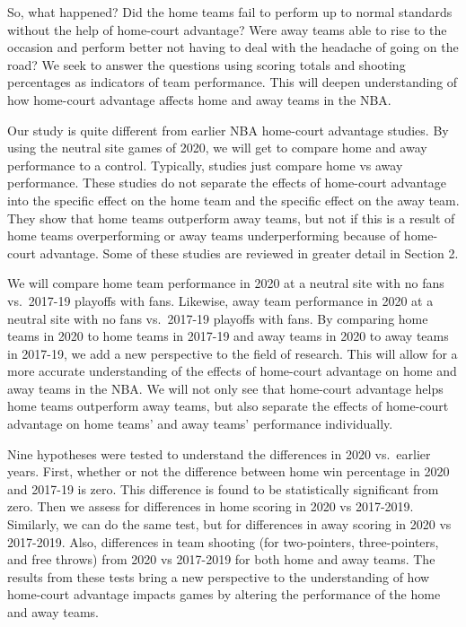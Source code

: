 \documentclass[10pt]{article}
\begin{document}
So, what happened? Did the home teams fail to perform up to normal standards
without the help of home-court advantage? Were away teams able to rise to
the occasion and perform better not having to deal with the headache of going
on the road? We seek to answer the questions using scoring totals and shooting
percentages as indicators of team performance. This will deepen understanding
of how home-court advantage affects home and away teams in the NBA.

Our study is quite different from earlier NBA home-court advantage studies.
By using the neutral site games of 2020, we will get to compare home and away
performance to a control. Typically, studies just compare home vs away
performance. These studies do not separate the effects of home-court advantage
into the specific effect on the home team and the specific effect on the away
team. They show that home teams outperform away teams, but not if this is a
result of home teams overperforming or away teams underperforming because of
home-court advantage. Some of these studies are reviewed in greater detail in Section 2.

We will compare home team performance in 2020 at a neutral site with
no fans vs.~2017-19 playoffs with fans. Likewise, away team performance in 2020
at a neutral site with no fans vs.~2017-19 playoffs with fans. By comparing home
teams in 2020 to home teams in 2017-19 and away teams in 2020 to away teams in
2017-19, we add a new perspective to the field of research. This will allow for
a more accurate understanding of the effects of home-court advantage on home and
away teams in the NBA. We will not only see that home-court advantage helps home
teams outperform away teams, but also separate the
effects of home-court advantage on home teams' and away teams' performance individually.

Nine hypotheses were tested to understand the differences in 2020 vs.~earlier
years. First, whether or not the difference between home win percentage in 2020
and 2017-19 is zero. This difference is found to be statistically
significant from zero. Then we assess for differences in home
scoring in 2020 vs 2017-2019. Similarly, we can do the same test, but for
differences in away scoring in 2020 vs 2017-2019. Also, differences in team
shooting (for two-pointers, three-pointers, and free throws) from 2020 vs 2017-2019
for both home and away teams. The results from these tests bring a new perspective
to the understanding of how home-court advantage impacts games by altering the performance
of the home and away teams.
\end{document}
